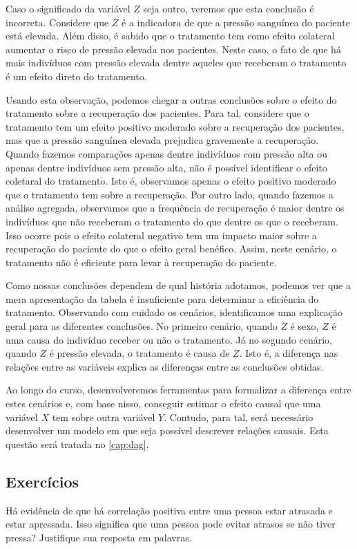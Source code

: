 Caso o significado da variável $Z$ seja outro, veremos que 
esta conclusão é incorreta.
Considere que $Z$ é a indicadora de que 
a pressão sanguínea do paciente está elevada.
Além disso, é sabido que o tratamento tem como
efeito colateral aumentar o risco de
pressão elevada nos pacientes.
Neste caso, o fato de que
há mais indivíduos com pressão elevada dentre aqueles que
receberam o tratamento é
um efeito direto do tratamento.

Usando esta observação,
podemos chegar a outras conclusões sobre o
efeito do tratamento sobre a recuperação dos pacientes.
Para tal, considere que o tratamento tem
um efeito positivo moderado sobre a recuperação dos pacientes,
mas que a pressão sanguínea elevada prejudica gravemente a recuperação.
Quando fazemos comparações apenas dentre indivíduos com pressão alta ou
apenas dentre indivíduos sem pressão alta, 
não é possível identificar o efeito coletaral do tratamento.
Isto é, observamos apenas
o efeito positivo moderado que o tratamento tem sobre a recuperação.
Por outro lado, quando fazemos a análise agregada,
observamos que a frequência de recuperação é 
maior dentre os indivíduos que não receberam o tratamento
do que dentre os que o receberam.
Isso ocorre pois o efeito colateral negativo tem um impacto
maior sobre a recuperação do paciente do que o efeito geral benéfico.
Assim, neste cenário, o tratamento não é
eficiente para levar à recuperação do paciente.

Como nossas conclusões dependem de qual história adotamos,
podemos ver que a mera apresentação da tabela é
insuficiente para determinar a eficiência do tratamento.
Observando com cuidado os cenários,
identificamos uma explicação geral para
as diferentes conclusões.
No primeiro cenário, quando $Z$ é sexo,
$Z$ é uma causa do indivíduo receber ou não o tratamento.
Já no segundo cenário, quando $Z$ é pressão elevada,
o tratamento é causa de $Z$. Isto é,
a diferença nas relações entre as variáveis
explica as diferenças entre as conclusões obtidas.

Ao longo do curso, desenvolveremos ferramentas para
formalizar a diferença entre estes cenários e, com base nisso,
conseguir estimar o efeito causal que uma variável $X$ tem sobre outra variável $Y$.
Contudo, para tal, será necessário desenvolver
um modelo em que seja possível descrever relações causais.
Esta questão será tratada no \cref{cap:dag}.

\subsection{Exercícios}

\begin{exercise}
 Há evidência de que há correlação positiva entre
 uma pessoa estar atrasada e estar apressada.
 Isso significa que uma pessoa pode evitar atrasos
 se não tiver pressa? 
 Justifique sua resposta em palavras.
\end{exercise}
